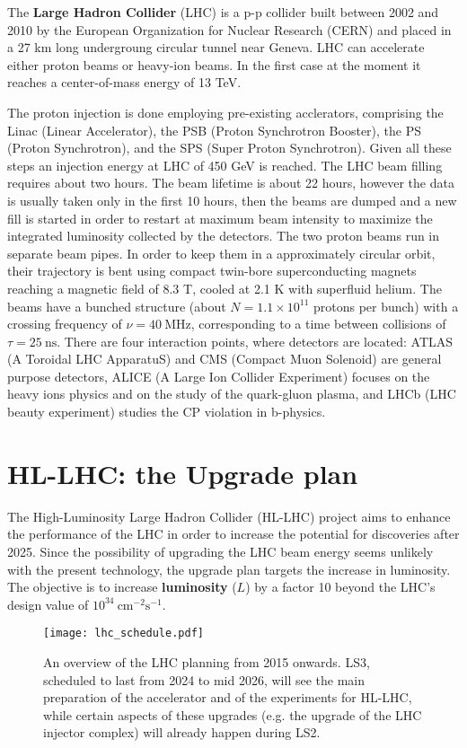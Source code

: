 \documentclass[12pt,twoside,a4paper]{report}
\numberwithin{equation}{section}
\begin{document}
The \textbf{Large Hadron Collider} (LHC) is a p-p collider built between 2002 and 2010 by the European Organization for Nuclear Research (CERN) and placed in a 27 km long undergroung circular tunnel near Geneva.
LHC can accelerate either proton beams or heavy-ion beams. In the first case at the moment it reaches a center-of-mass energy of 13 TeV. 

The proton injection is done employing pre-existing acclerators, comprising the Linac (Linear Accelerator), the PSB (Proton Synchrotron Booster), the PS (Proton Synchrotron), and the SPS (Super Proton Synchrotron). Given all these steps an injection energy at LHC of 450 GeV is reached. The LHC beam filling requires about two hours. The beam lifetime is about 22 hours, however the data is usually taken only in the first 10 hours, then the beams are dumped and a new fill is started in order to restart at maximum beam intensity to maximize the integrated luminosity collected by the detectors.
The two proton beams run in separate beam pipes. In order to keep them in a approximately circular orbit, their trajectory is bent using compact twin-bore superconducting magnets reaching a magnetic field of 8.3 T, cooled at 2.1 K with superfluid helium.
The beams have a bunched structure (about $N = 1.1 \times 10^{11}$ protons per bunch) with a crossing frequency of $\nu = 40\ \mathrm{MHz}$, corresponding to a time between collisions of $\tau = 25\ \mathrm{ns}$.
There are four interaction points, where detectors are located: ATLAS (A Toroidal LHC ApparatuS) and CMS (Compact Muon Solenoid) are general purpose detectors, ALICE (A Large Ion Collider Experiment) focuses on the heavy ions physics and on the study of the quark-gluon plasma, and LHCb (LHC beauty experiment) studies the CP violation in b-physics.

\section{HL-LHC: the Upgrade plan}
The High-Luminosity Large Hadron Collider (HL-LHC) project aims to enhance the performance of the LHC in order to increase the potential for discoveries after 2025. Since the possibility of upgrading the LHC beam energy seems unlikely with the present technology, the upgrade plan targets the increase in luminosity. The objective is to increase \textbf{luminosity} ($L$) by a factor 10 beyond the LHC’s design value of $10^{34}\ \mathrm{cm^{-2}s^{-1}}$.
\begin{figure}[!htb]
\texttt{[image: lhc\_schedule.pdf]}
\caption{\label{fig:planning} An overview of the LHC planning from 2015 onwards. LS3, scheduled to last from 2024 to mid 2026, will see the main preparation of the accelerator and of the experiments for HL-LHC, while certain aspects of these upgrades (e.g. the upgrade of the LHC injector complex) will already happen during LS2.}
\end{figure}
\end{document}
